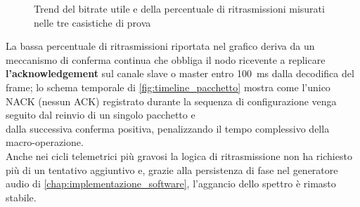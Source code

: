 \begin{figure}[H]
    \centering
    \caption{Trend del bitrate utile e della percentuale di ritrasmissioni misurati nelle tre casistiche di prova}
    \label{fig:trend_bitrate}
\end{figure}

La bassa percentuale di ritrasmissioni riportata nel grafico deriva da un meccanismo di conferma
 continua che obbliga il nodo ricevente a replicare \textbf{l'acknowledgement} sul canale slave o master entro \SI{100}{\milli\second} dalla decodifica del frame;
  lo schema temporale di \autoref{fig:timeline_pacchetto} 
  mostra come l'unico NACK (nessun ACK) registrato durante la sequenza di configurazione venga seguito dal reinvio di un singolo pacchetto e \\
  dalla successiva conferma positiva, penalizzando il tempo complessivo della macro-operazione.\\
   Anche nei cicli telemetrici più gravosi la logica di ritrasmissione non ha richiesto più di un tentativo aggiuntivo e,
    grazie alla persistenza di fase nel generatore audio di \autoref{chap:implementazione_software}, 
    l'aggancio dello spettro è rimasto stabile.

